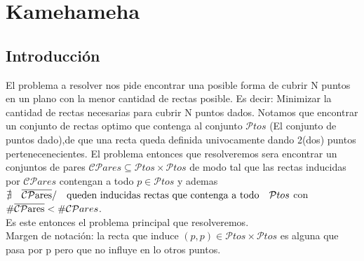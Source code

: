 \section{Kamehameha}

	\subsection{Introducción}
		El problema a resolver nos pide encontrar una posible forma de cubrir N puntos en un plano con la menor cantidad de rectas posible.
		Es decir: Minimizar la cantidad de rectas necesarias para cubrir N puntos dados.
		Notamos que encontrar un conjunto de rectas optimo que contenga al conjunto $\mathcal{P}tos$ (El conjunto de puntos dado),de que una recta queda definida univocamente dando 2(dos) puntos pertenecenecientes. El problema entonces que resolveremos sera encontrar un conjuntos de pares $\mathcal{CP}ares	    \subseteq \mathcal{P}tos \times \mathcal{P}tos$ de modo tal que las rectas inducidas por $\mathcal{CP}ares$ contengan a todo $p \in \mathcal{P}tos$ y ademas $\nexists \quad \overline{\rm \mathcal{CP}ares} / \quad \textrm{queden  inducidas rectas que contenga a todo} \quad \mathcal{P}tos$ con  $\# \overline{\rm \mathcal{CP}ares} < \# \mathcal{CP}ares$. \\
		Es este entonces el problema principal que resolveremos.\\
		Margen de notación: la recta que induce $(p,p) \in \mathcal{P}tos \times \mathcal{P}tos$ es alguna que pasa por p pero que no influye en lo otros puntos.
	
